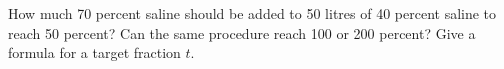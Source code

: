 How much 70 percent saline should be added to 50 litres of 40 percent saline to reach 50 percent? Can the same procedure reach 100 or 200 percent? Give a formula for a target fraction $t$.
